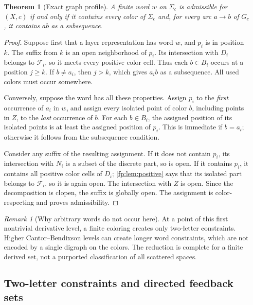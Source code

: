 \documentclass[11pt,letterpaper]{article}
\numberwithin{equation}{section}
\newtheorem{theorem}{Theorem}[section]
\theoremstyle{definition}
\theoremstyle{remark}
\newtheorem{remark}[remark]{Remark}
\theoremstyle{definition}
\newcommand{\F}{\mathcal F}
\begin{document}
\begin{theorem}[Exact graph profile]\label{fp:thm:profile}
A finite word \(w\) on \(\Sigma_c\) is admissible for \((X,c)\) if and
only if it contains every color of \(\Sigma_c\) and, for every arc
\(a\to b\) of \(G_c\), it contains \(ab\) as a subsequence.
\end{theorem}
\begin{proof}
Suppose first that a layer representation has word \(w\), and \(p_i\)
is in position \(k\). The suffix from \(k\) is an open neighborhood of
\(p_i\). Its intersection with \(D_i\) belongs to \(\F_i\), so it
meets every positive color cell. Thus each \(b\in B_i\) occurs at a
position \(j\geq k\). If \(b\ne a_i\), then \(j>k\), which gives
\(a_ib\) as a subsequence. All used colors must occur somewhere.

Conversely, suppose the word has all these properties. Assign \(p_i\)
to the \emph{first} occurrence of \(a_i\) in \(w\), and assign every
isolated point of color \(b\), including points in \(Z\), to the
\emph{last} occurrence of \(b\). For each \(b\in B_i\), the assigned
position of its isolated points is at least the assigned position of
\(p_i\). This is immediate if \(b=a_i\); otherwise it follows from
the subsequence condition.

Consider any suffix of the resulting assignment. If it does not contain
\(p_i\), its intersection with \(N_i\) is a subset of the discrete part,
so is open. If it contains \(p_i\), it contains all positive color cells
of \(D_i\); \cref{fp:lem:positive} says that its isolated part belongs to
\(\F_i\), so it is again open. The intersection with \(Z\) is open.
Since the decomposition is clopen, the suffix is globally open. The
assignment is color-respecting and proves admissibility.
\end{proof}

\begin{remark}[Why arbitrary words do not occur here]
At a point of this first nontrivial derivative level, a finite coloring
creates only two-letter constraints. Higher Cantor--Bendixson levels can
create longer word constraints, which are not encoded by a single digraph
on the colors. The reduction is complete for a finite derived set, not a
purported classification of all scattered spaces.
\end{remark}

\subsection{Two-letter constraints and directed feedback sets}
\end{document}
